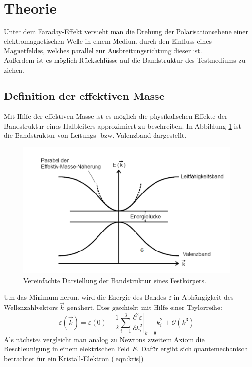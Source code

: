 \section{Theorie}
\label{sec:Theorie}
Unter dem Faraday-Effekt versteht man die Drehung der Polarisationsebene einer elektromagnetischen Welle in einem Medium durch den Einfluss eines Magnetfeldes, welches parallel zur Ausbreitungsrichtung dieser ist. \\
Außerdem ist es möglich Rückschlüsse auf die Bandstruktur des Testmediums zu ziehen.
\subsection{Definition der effektiven Masse}
\label{sec:effektive_masse}
Mit Hilfe der effektiven Masse ist es möglich die physikalischen Effekte der Bandstruktur eines Halbleiters approximiert zu beschreiben. In Abbildung \ref{fig:band} ist die Bandstruktur von Leitungs- bzw. Valenzband dargestellt.
\begin{figure}
  \centering
  \includegraphics[scale=0.7]{fig/band.png}
  \caption{Vereinfachte Darstellung der Bandstruktur eines Festkörpers. \cite[6]{Bild2}}
  \label{fig:band}
\end{figure}
Um das Minimum herum wird die Energie des Bandes $\varepsilon$ in Abhängigkeit des Wellenzahlvektors $\vec{k}$ genähert. Dies geschieht mit Hilfe einer Taylorreihe:
\begin{equation}
  \label{eqn:energiegl}
  \varepsilon(\vec{k})=\varepsilon(0) + \frac{1}{2}\sum_{i=1}^3 \left.\frac{\partial^2 \varepsilon}{\partial k_i^2}\right|_{k=0}k_i^2 + \mathcal{O}(k^3)
\end{equation}
Als nächstes vergleicht man analog zu Newtons zweitem Axiom die Beschleunigung in einem elektrischen Feld $E$. Dafür ergibt sich quantemechanisch betrachtet für ein Kristall-Elektron (\ref{eqn:kris})
